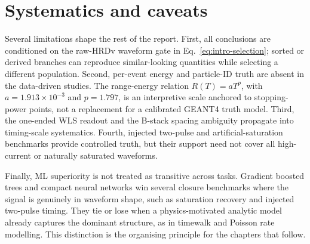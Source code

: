 \section{Systematics and caveats}

Several limitations shape the rest of the report.  First, all conclusions are
conditioned on the raw-HRDv waveform gate in Eq.~\eqref{eq:intro-selection};
sorted or derived branches can reproduce similar-looking quantities while
selecting a different population.  Second, per-event energy and particle-ID
truth are absent in the data-driven studies.  The range-energy relation
$R(T)=aT^p$, with $a=1.913\times10^{-3}$ and $p=1.797$, is an interpretive
scale anchored to stopping-power points, not a replacement for a calibrated
GEANT4 truth model.  Third, the one-ended WLS readout and the B-stack spacing
ambiguity propagate into timing-scale systematics.  Fourth, injected two-pulse
and artificial-saturation benchmarks provide controlled truth, but their
support need not cover all high-current or naturally saturated waveforms.

Finally, ML superiority is not treated as transitive across tasks.  Gradient
boosted trees and compact neural networks win several closure benchmarks where
the signal is genuinely in waveform shape, such as saturation recovery and
injected two-pulse timing.  They tie or lose when a physics-motivated analytic
model already captures the dominant structure, as in timewalk and Poisson
rate modelling.  This distinction is the organising principle for the
chapters that follow.
